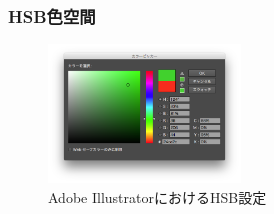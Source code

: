 \documentclass[dvipdfmx]{beamer}
\begin{document}
        \begin{frame}
            \frametitle{HSB色空間}
                \begin{figure}[htb]
                    \includegraphics[width=51mm]{images/10.png}
                    \caption{Adobe IllustratorにおけるHSB設定}
                    \label{fig:10}
                \end{figure}
        \end{frame}


\end{document}
